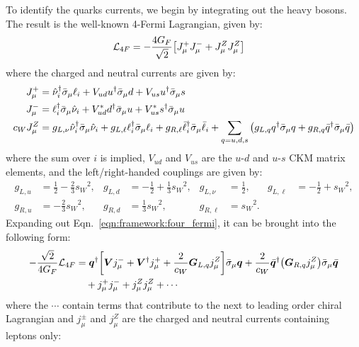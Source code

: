 \documentclass[a4paper,11pt]{article} \pdfoutput=1
\newcommand{\cL}{\mathcal{L}}
\newcommand{\cw}{{c_{W}}}
\newcommand{\sw}{{s_{W}}}
\newcommand{\gf}{{G_{F}}}
\newcommand{\sibar}{{\bar{\sigma}}}
\begin{document}
To identify the quarks currents, we begin by integrating out the heavy bosons. The result is the well-known
4-Fermi Lagrangian, given by:
\begin{align}\label{eqn:framework:four_fermi}
	\cL_{4F} & = -\frac{4\gf}{\sqrt{2}}\qty[J^{+}_{\mu}J^{-}_{\mu} + J^{Z}_{\mu}J^{Z}_{\mu}]
\end{align}
where the charged and neutral currents are given by:
\begin{align}
	J^{+}_{\mu}     & = \hat{\nu}_{i}^{\dagger}\sibar_{\mu}\ell_{i} + V_{ud}u^{\dagger}\sibar_{\mu}d + V_{us}u^{\dagger}\sibar_{\mu}s         \\
	J^{-}_{\mu}     & = \ell_{i}^{\dagger}\sibar_{\mu}\hat{\nu}_{i} + V^{*}_{ud}d^{\dagger}\sibar_{\mu}u + V^{*}_{us}s^{\dagger}\sibar_{\mu}u \\
	\cw J^{Z}_{\mu} & =
	g_{L,\nu}\hat{\nu}_{i}^{\dagger}\sibar_{\mu}\hat{\nu}_{i}
	+ g_{L,\ell}\ell_{i}^{\dagger}\sibar_{\mu}\ell_{i}
	+ g_{R,\ell}\bar{\ell}_{i}^{\dagger}\sibar_{\mu}\bar{\ell}_{i}
	+ \sum_{q=u,d,s}\qty(
	g_{L,q}q^{\dagger}\bar{\sigma}_{\mu}q + g_{R,q}\bar{q}^{\dagger}\bar{\sigma}_{\mu}\bar{q})
\end{align}
where the sum over \(i\) is implied, \(V_{ud}\) and \(V_{us}\) are the \(u\)-\(d\)
and \(u\)-\(s\) CKM matrix elements, and the left/right-handed couplings are given by:
\begin{align}
	g_{L,u}    & = \frac{1}{2} - \frac{2}{3}\sw^2,  &
	g_{L,d}    & = -\frac{1}{2} + \frac{1}{3}\sw^2, &
	g_{L,\nu}  & = \frac{1}{2},                     &
	g_{L,\ell} & = -\frac{1}{2} + \sw^2,              \\
	g_{R,u}    & = -\frac{2}{3}\sw^2,               &
	g_{R,d}    & = \frac{1}{3}\sw^2,                &
	g_{R,\ell} & = \sw^2 .
\end{align}
Expanding out Eqn.~\ref{eqn:framework:four_fermi}, it can be brought into the following
form:
\begin{align}
	-\frac{\sqrt{2}}{4\gf}\cL_{4F}
	 & =
	\bm{q}^{\dagger}\qty[\bm{V}j_{\mu}^{-} + \bm{V}^{\dagger}j_{\mu}^{+} + \frac{2}{\cw}\bm{G}_{L,q}j_{\mu}^{Z}]\sibar_{\mu}\bm{q}
	+ \frac{2}{\cw}\bar{\bm{q}}^{\dagger}\qty(\bm{G}_{R,q}j_{\mu}^{Z})\sibar_{\mu}\bar{\bm{q}} \\
	 & \quad
	+ j_{\mu}^{+}j_{\mu}^{-} + j_{\mu}^{Z}j_{\mu}^{Z}
	+ \cdots \notag
\end{align}
where the \(\cdots\) contain terms that contribute to the next to leading order
chiral Lagrangian and \(j^{\pm}_{\mu}\) and \(j^{Z}_{\mu}\) are the charged and neutral currents containing leptons only:
\end{document}

